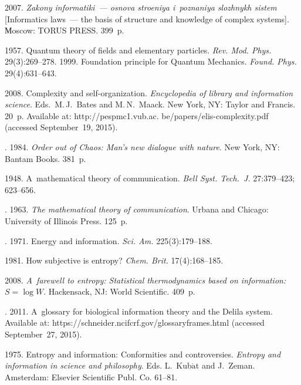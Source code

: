 \begin{multicols}{2}
{{\begin{thebibliography}{99}
 2007. \textit{Zakony informatiki~--- 
osnova stroeniya i~poznaniya slozhnykh sistem} 
[Informatics laws~--- the basis of structure and knowledge of complex systems].
  Мoscow: TORUS PRESS. 399~p. 

 1957. Quantum theory of fields and elementary particles. \textit{Rev. 
Mod. Phys.} 29(3):269--278.
 1999. Foundation principle for Quantum Mechanics. \textit{Found. 
Phys.} 29(4):631--643.

 2008. Complexity and self-organization. \textit{Encyclopedia of library 
and information science}.  Eds.\ M.\,J.~Bates and M.\,N.~Maack. New York, NY: Taylor and 
Francis. 20~p. Available at: {\sf  http://pespmc1.vub.ac. be/papers/elis-complexity.pdf} (accessed 
September~19, 2015).

. 1984. \textit{Order out of Chaos:
Man's new dialogue with nature}. New York, NY: Bantam 
Books. 381~p.

 1948. A~mathematical theory of communication. \textit{Bell Syst.
Tech.~J.} 27:379--423; 623--656.

. 1963. \textit{The mathematical theory of 
communication}. Urbana and Chicago: University of Illinois Press. 125~p.

. 1971. Energy and information. \textit{Sci. Am.}  
225(3):179--188. 

 1981. How subjective is entropy? \textit{Chem. Brit.}  
17(4):168--185. 

 2008. \textit{A~farewell to entropy: Statistical thermodynamics based on 
information: $S=\log W$}. Hackensack, NJ: World Scientific. 409~p.

. 2011.  
A~glossary for biological information theory and the Delila system. Available at: {\sf  
https://schneider.ncifcrf.gov/glossaryframes.html} (accessed September~27, 2015). 

 1975. Entropy and information: Conformities and controversies. \textit{Entropy 
and information in science and philosophy}. Eds. L.~Kub$\acute{\mbox{a}}$t and J.~Zeman. 
Amsterdam: Elsevier Scientific Publ. Co.  61--81.


\end{thebibliography}}}
\end{multicols}
